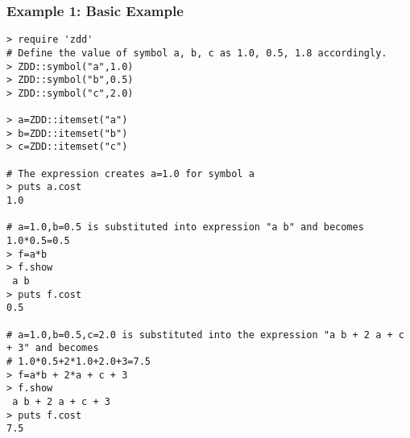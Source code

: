 \subsubsection*{Example 1: Basic Example}



\begin{Verbatim}[baselinestretch=0.7,frame=single]
> require 'zdd'
# Define the value of symbol a, b, c as 1.0, 0.5, 1.8 accordingly.
> ZDD::symbol("a",1.0)
> ZDD::symbol("b",0.5)
> ZDD::symbol("c",2.0)

> a=ZDD::itemset("a")
> b=ZDD::itemset("b")
> c=ZDD::itemset("c")

# The expression creates a=1.0 for symbol a
> puts a.cost
1.0

# a=1.0,b=0.5 is substituted into expression "a b" and becomes 1.0*0.5=0.5
> f=a*b
> f.show
 a b
> puts f.cost
0.5

# a=1.0,b=0.5,c=2.0 is substituted into the expression "a b + 2 a + c + 3" and becomes
# 1.0*0.5+2*1.0+2.0+3=7.5
> f=a*b + 2*a + c + 3
> f.show
 a b + 2 a + c + 3
> puts f.cost
7.5
\end{Verbatim}
